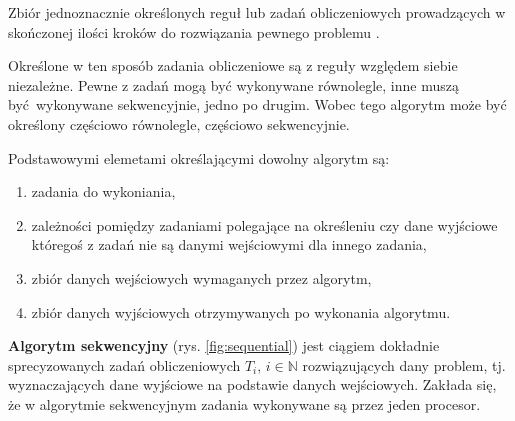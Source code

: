 \begin{definicja}[Algorytm]\label{def:algorytm}
Zbiór jednoznacznie określonych reguł lub zadań obliczeniowych prowadzących w skończonej ilości kroków do rozwiązania pewnego problemu \cite{IEEE}.
\end{definicja}


Określone w ten sposób zadania obliczeniowe są z reguły względem siebie niezależne. Pewne z zadań mogą być wykonywane równolegle, inne muszą być wykonywane sekwencyjnie, jedno po drugim. Wobec tego algorytm może być określony częściowo równolegle, częściowo sekwencyjnie.


Podstawowymi elemetami określającymi dowolny algorytm są:
\begin{enumerate}
\item zadania do wykoniania,
\item zależności pomiędzy zadaniami polegające na określeniu czy 
dane wyjściowe któregoś z zadań nie są danymi wejściowymi dla innego zadania,
\item zbiór danych wejściowych wymaganych przez algorytm,
\item zbiór danych wyjściowych otrzymywanych po wykonania algorytmu.
\end{enumerate}


\begin{definicja}\label{def:algorytm_sekwencyjny}
\textbf{Algorytm sekwencyjny} (rys.  \ref{fig:sequential}) jest ciągiem dokładnie sprecyzowanych zadań obliczeniowych \(T_i,\, i\in\mathbb{N}\) rozwiązujących dany problem, tj. wyznaczających dane wyjściowe na podstawie danych wejściowych. Zakłada się, że w algorytmie sekwencyjnym zadania wykonywane są przez jeden procesor.

\end{definicja}

